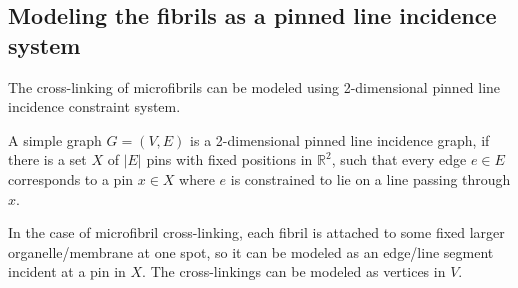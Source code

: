 \subsection{Modeling the fibrils as a pinned line incidence system}



The cross-linking of microfibrils can be modeled using 2-dimensional pinned line incidence constraint system. 

\begin{definition}  \label{prob:pinned_subspace}
A simple graph $G=(V,E)$ is a 2-dimensional pinned line incidence graph, 
if there is  a  set $X$ of $|E|$ pins with fixed positions in $\mathbb{R}^2$,
such that  every edge $e \in E$ corresponds to a pin $x \in X$ where $e$ is constrained to lie on a line passing through $x$.

\end{definition}



In the case of microfibril cross-linking, each fibril is 
attached to some fixed larger organelle/membrane at one spot, 
so it can be modeled as an edge/line segment incident at a pin in $X$. 
The cross-linkings can be modeled as vertices in $V$.


